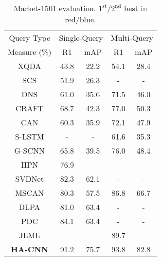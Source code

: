 \documentclass[10pt,twocolumn,letterpaper]{article}
\begin{document}
\begin{table} \centering
\renewcommand{\arraystretch}{1}
	\setlength{\tabcolsep}{0.28 cm} 
\caption{Market-1501 evaluation. $1^\text{st}/2^\text{nd}$ best in red/blue.
}
\begin{tabular}{|c|cc|cc|}
		\hline
		Query Type &  \multicolumn{2}{c|}{Single-Query} &\multicolumn{2}{c|}{Multi-Query} \\ \cline{1-5}
		Measure (\%)    & R1 & mAP & R1 & mAP  \\ \hline \hline
		XQDA\cite{liao2015person} &  43.8 &  22.2  &  54.1 &  28.4\\   SCS\cite{chen2016similarity} &  51.9 &  26.3 &  - &  -  \\  DNS\cite{zhang2016learning} & 61.0 & 35.6  &  71.5 &  46.0  \\ 
		CRAFT\cite{chen2017person} & 68.7 & 42.3  &  77.0 &  50.3  \\ 
		\hline
		CAN\cite{liu2017end} & 60.3 & 35.9  & 72.1 &  47.9  \\ 
		S-LSTM\cite{varior2016siamese} & - & -  & 61.6 &  35.3  \\ 
		G-SCNN\cite{varior2016gated} & 65.8 & 39.5  & 76.0 &  48.4  \\ 
		HPN \cite{liu2017hydraplus} & 76.9 & -  & - &  -  \\ 
		SVDNet \cite{sun2017svdnet}&  82.3 &  62.1 &- & -  \\ 
\hline
		MSCAN \cite{li2017learning} & 80.3 & 57.5  &86.8 &  66.7  \\
		DLPA \cite{zhao2017deeply} & 81.0 & 63.4  & - &  -  \\ 
		PDC \cite{su2017pose} & 84.1 & 63.4  & - &  -  \\ 
		JLML \cite{li2017person} 
		& \color{blue}{85.1} &  \color{blue}{65.5}  & \color{blue} {89.7} & \color{blue}{74.5}  \\
\hline
{\bf HA-CNN} & \color{red} {91.2} &  \color{red} {75.7}  &   \color{red} {93.8} &   \color{red} {82.8}  \\ 
		\hline
	\end{tabular}\label{tab:res_market}
	\vspace{-0.35cm}
\end{table}
\vspace{0.05cm}
\end{document}
